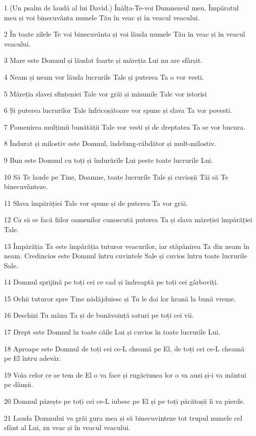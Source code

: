 \par 1 (Un psalm de laudă al lui David.) Înălța-Te-voi Dumnezeul meu, Împăratul meu și voi binecuvânta numele Tău în veac și în veacul veacului.
\par 2 În toate zilele Te voi binecuvânta și voi lăuda numele Tău în veac și în veacul veacului.
\par 3 Mare este Domnul și lăudat foarte și măreția Lui nu are sfârșit.
\par 4 Neam și neam vor lăuda lucrurile Tale și puterea Ta o vor vesti.
\par 5 Măreția slavei sfințeniei Tale vor grăi și minunile Tale vor istorisi
\par 6 Și puterea lucrurilor Tale înfricoșătoare vor spune și slava Ta vor povesti.
\par 7 Pomenirea mulțimii bunătății Tale vor vesti și de dreptatea Ta se vor bucura.
\par 8 Îndurat și milostiv este Domnul, îndelung-răbdător și mult-milostiv.
\par 9 Bun este Domnul cu toți și îndurările Lui peste toate lucrurile Lui.
\par 10 Să Te laude pe Tine, Doamne, toate lucrurile Tale și cuvioșii Tăi să Te binecuvânteze.
\par 11 Slava împărăției Tale vor spune și de puterea Ta vor grăi.
\par 12 Ca să se facă fiilor oamenilor cunoscută puterea Ta și slava măreției împărăției Tale.
\par 13 Împărăția Ta este împărăția tuturor veacurilor, iar stăpânirea Ta din neam în neam. Credincios este Domnul întru cuvintele Sale și cuvios întru toate lucrurile Sale.
\par 14 Domnul sprijină pe toți cei ce cad și îndreaptă pe toți cei gârboviți.
\par 15 Ochii tuturor spre Tine nădăjduiesc și Tu le dai lor hrană la bună vreme.
\par 16 Deschizi Tu mâna Ta și de bunăvoință saturi pe toți cei vii.
\par 17 Drept este Domnul în toate căile Lui și cuvios în toate lucrurile Lui.
\par 18 Aproape este Domnul de toți cei ce-L cheamă pe El, de toți cei ce-L cheamă pe El întru adevăr.
\par 19 Voia celor ce se tem de El o va face și rugăciunea lor o va auzi și-i va mântui pe dânșii.
\par 20 Domnul păzește pe toți cei ce-L iubesc pe El și pe toți păcătoșii îi va pierde.
\par 21 Lauda Domnului va grăi gura mea și să binecuvinteze tot trupul numele cel sfânt al Lui, zn veac și în veacul veacului.

